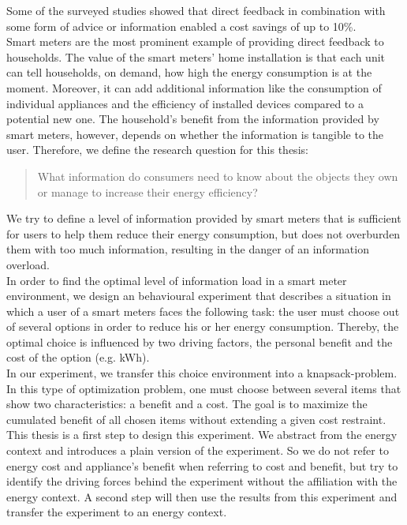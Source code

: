 Some of the surveyed studies showed that direct feedback in combination with some form of advice or information enabled a cost savings of up to 10\%.\\
Smart meters are the most prominent example of providing direct feedback to households. The value of the smart meters' home installation is that each unit can tell households, on demand, how high the energy consumption is at the moment. Moreover, it can add additional information like the consumption of individual appliances and the efficiency of installed devices compared to a potential new one. The household's benefit from the information provided by smart meters, however, depends on whether the information is tangible to the user.
Therefore, we define the research question for this thesis:
\begin{quotation}
What information do consumers need to know about the objects they own or manage to increase their energy efficiency? 
\end{quotation}
We try to define a level of information provided by smart meters that is sufficient for users to help them reduce their energy consumption, but does not overburden them with too much information, resulting in the danger of an information overload.\\
In order to find the optimal level of information load in a smart meter environment, we design an behavioural experiment that describes a situation in which a user of a smart meters faces the following task: the user must choose out of several options in order to reduce his or her energy consumption. Thereby, the optimal choice is influenced by two driving factors, the personal benefit and the cost of the option (e.g. kWh).\\
In our experiment, we transfer this choice environment into a knapsack-problem. In this type of optimization problem, one must choose between several items that show two characteristics: a benefit and a cost. The goal is to maximize the cumulated benefit of all chosen items without extending a given cost restraint.\\ 
This thesis is a first step to design this experiment. We abstract from the energy context and introduces a plain version of the experiment. So we do not refer to energy cost and appliance's benefit when referring to cost and benefit, but try to identify the driving forces behind the experiment without the affiliation with the energy context. A second step will then use the results from this experiment and transfer the experiment to an energy context.\\ 
